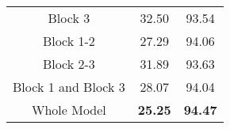 \documentclass{article} \usepackage{iclr2022_conference,times}
\begin{document}
\begin{table}[t]
{{\begin{tabular}{c|cc}
Block 3                                  & 32.50                  & 93.54                  \\
Block 1-2                       & 27.29                  & 94.06                  \\
Block 2-3                       & 31.89                  & 93.63                  \\
Block 1 and Block 3                      & 28.07                  & 94.04                  \\
\cellcolor{greyL}Whole Model                       & \cellcolor{greyL}\textbf{25.25}                  & \cellcolor{greyL}\textbf{94.47}                  \\
\bottomrule[1.5pt]      
\end{tabular}
}}
\end{table}
\end{document}
